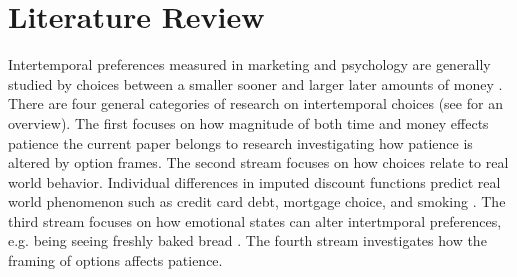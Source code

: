 \documentclass[]{article}
\begin{document}

%

\section{Literature Review}

Intertemporal preferences measured in marketing and psychology are generally studied by choices between a smaller sooner and larger later amounts of money \cite{Zauberman2014}. 
There are four general categories of research on  intertemporal choices (see  for an overview).
The first focuses on how magnitude of both time and money effects patience \cite{Scholten2006, Thaler1981}
 the current paper belongs to research investigating how patience is altered by option frames. 
 The second stream focuses on how choices relate to real world behavior.
 Individual differences in imputed discount functions predict real world phenomenon such as credit card debt,  mortgage choice, and smoking \cite{MacKillop2011, Meier2009, Johnson2011}. 
 The third stream focuses on how emotional states can alter intertmporal preferences, e.g. being seeing freshly baked bread \cite{Li2008}. 
 The fourth stream investigates how the framing of options affects patience. 
  
\end{document}
